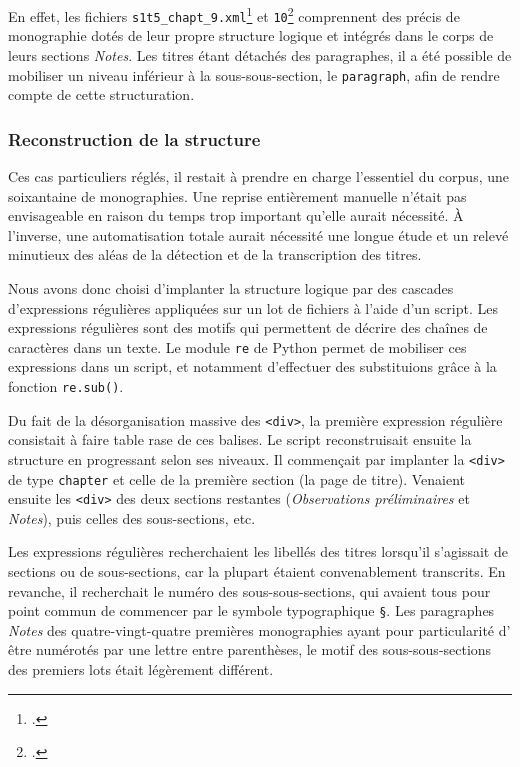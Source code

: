 En effet, les fichiers \texttt{s1t5\_chapt\_9.xml}\footcite{mono041a} et \texttt{10}\footcite{mono042a} comprennent des précis de monographie dotés de leur propre structure logique et intégrés dans le corps de leurs sections \textit{Notes}. Les titres étant détachés des paragraphes, il a été possible de mobiliser un niveau inférieur à la sous-sous-section, le \texttt{paragraph}, afin de rendre compte de cette structuration.

\subsubsection{Reconstruction de la structure}

Ces cas particuliers réglés, il restait à prendre en charge l'essentiel du corpus, \cad{} une soixantaine de monographies. Une reprise entièrement manuelle n'était pas envisageable en raison du temps trop important qu'elle aurait nécessité. À l'inverse, une automatisation totale aurait nécessité une longue étude et un relevé minutieux des aléas de la détection et de la transcription des titres.

Nous avons donc choisi d'implanter la structure logique par des cascades d'expressions régulières appliquées sur un lot de fichiers à l'aide d'un script. Les expressions régulières sont des motifs qui permettent de décrire des chaînes de caractères dans un texte. Le module \texttt{re} de Python permet de mobiliser ces expressions dans un script, et notamment d'effectuer des substituions grâce à la fonction \texttt{re.sub()}.

Du fait de la désorganisation massive des \texttt{<div>}, la première expression régulière consistait à faire table rase de ces balises. Le script reconstruisait ensuite la structure en progressant selon ses niveaux. Il commençait par implanter la \texttt{<div>} de type \texttt{chapter} et celle de la première section (la page de titre). Venaient ensuite les \texttt{<div>} des deux sections restantes (\textit{Observations préliminaires} et \textit{Notes}), puis celles des sous-sections, etc.

Les expressions régulières recherchaient les libellés des titres lorsqu'il s'agissait de sections ou de sous-sections, car la plupart étaient convenablement transcrits. En revanche, il recherchait le numéro des sous-sous-sections, qui avaient tous pour point commun de commencer par le symbole typographique \texttt{§}. Les paragraphes \textit{Notes} des quatre-vingt-quatre premières monographies ayant pour particularité d'
être numérotés par une lettre entre parenthèses, le motif des sous-sous-sections des premiers lots était légèrement différent.

